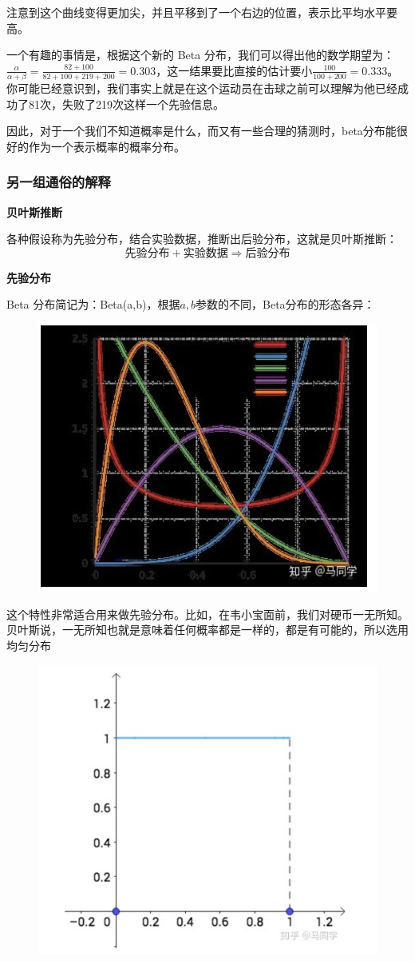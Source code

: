 \documentclass[12pt]{article}
\begin{document}
注意到这个曲线变得更加尖，并且平移到了一个右边的位置，表示比平均水平要高。

一个有趣的事情是，根据这个新的 Beta 分布，我们可以得出他的数学期望为：$\frac{\alpha}{\alpha+\beta} = \frac{82+100}{82+100+219+200} = 0.303$，这一结果要比直接的估计要小$\frac{100}{100+200}=0.333$。你可能已经意识到，我们事实上就是在这个运动员在击球之前可以理解为他已经成功了81次，失败了219次这样一个先验信息。

因此，对于一个我们不知道概率是什么，而又有一些合理的猜测时，beta分布能很好的作为一个表示概率的概率分布。

\subsubsection{另一组通俗的解释\cite{Commonly_Understand_Beta_Distribution_Ma}}
\textbf{贝叶斯推断}

各种假设称为先验分布，结合实验数据，推断出后验分布，这就是贝叶斯推断：
$$
\text{先验分布} + \text{实验数据} \Rightarrow \text{后验分布}
$$

\textbf{先验分布}

Beta 分布简记为：Beta(a,b)，根据$a, b$参数的不同，Beta分布的形态各异：
\begin{figure}[H]
  \centering
  \includegraphics[width=.5\textwidth]{fig/Beta_Distribution_Different_Examples.png} 
\end{figure}

这个特性非常适合用来做先验分布。比如，在韦小宝面前，我们对硬币一无所知。贝叶斯说，一无所知也就是意味着任何概率都是一样的，都是有可能的，所以选用均匀分布
\begin{figure}[H]
  \centering
  \includegraphics[width=.3\textwidth]{fig/Beta_Distribution_Ma_Example_1.png} 
\end{figure}
\end{document}
